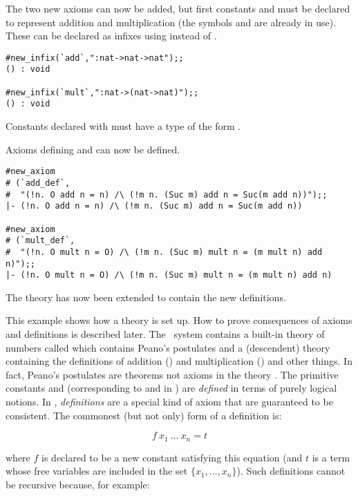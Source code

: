 \noindent The two new axioms can now be added, but first constants  and
 must  be  declared  to  represent  addition  and  multiplication (the
symbols \ml{+}  and  \ml{*}  are  already in  use).   These can  be declared as
infixes using  instead of .

\begin{session}\begin{verbatim}
#new_infix(`add`,":nat->nat->nat");;
() : void

#new_infix(`mult`,":nat->(nat->nat)");;
() : void
\end{verbatim}\end{session}

\noindent Constants declared with 
must have a type of the form
\ml{$\sigma$->($\sigma$->$\sigma$)}.

Axioms defining  and  can now be defined.

\begin{session}\begin{verbatim}
#new_axiom
# (`add_def`,
#  "(!n. O add n = n) /\ (!m n. (Suc m) add n = Suc(m add n))");;
|- (!n. O add n = n) /\ (!m n. (Suc m) add n = Suc(m add n))

#new_axiom
# (`mult_def`,
#  "(!n. O mult n = O) /\ (!m n. (Suc m) mult n = (m mult n) add n)");;
|- (!n. O mult n = O) /\ (!m n. (Suc m) mult n = (m mult n) add n)
\end{verbatim}\end{session}

\noindent The theory  has now been extended to contain the new
definitions.

This example shows how a theory is set up. How to prove consequences of axioms and
definitions is described later. The \HOL\ system contains a built-in
theory of numbers called  which contains Peano's postulates and a
(descendent)  theory  containing the definitions of addition
(\ml{+}) and multiplication (\ml{*}) and other things.
In fact, Peano's
postulates are theorems not axioms in the theory . The primitive constants
 and  (corresponding to  and  in ) are
{\it defined\/} in terms of purely logical notions.
In \HOL, {\it definitions\/} are a special kind of axiom that are
guaranteed to be consistent. The commonest (but not only) form of a definition is:

\[f\ x_1\ \ldots\ x_n = t\]

\noindent where $f$ is declared to be a new constant satisfying this
equation (and $t$ is a term whose free variables are included in the set
$\{x_1,\ldots,x_n\}$).  Such definitions cannot be recursive because, for
example:

